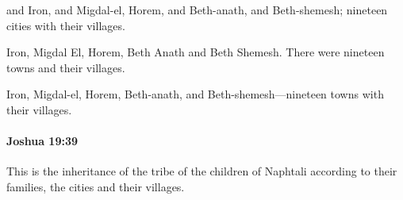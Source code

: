 			\begin{versebox}
					\item[BHS] 
					\item[ASV] and Iron, and Migdal-el, Horem, and Beth-anath, and Beth-shemesh; nineteen cities with their villages.
					\item[NIV] Iron, Migdal El, Horem, Beth Anath and Beth Shemesh. There were nineteen towns and their villages.
					\item[NRSV] Iron, Migdal-el, Horem, Beth-anath, and Beth-shemesh—nineteen towns with their villages.
			\end{versebox}

		\paragraph{Joshua 19:39} %
			\label{JOSHUA-19-39}

			This is the inheritance of the tribe of the children of Naphtali according to their families, the cities and their villages.

